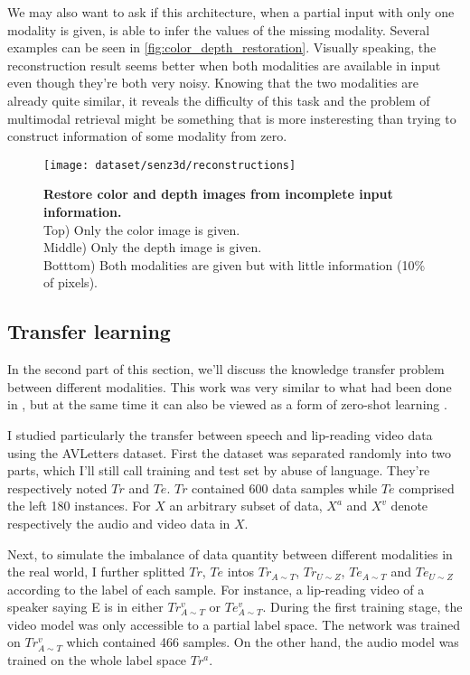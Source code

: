 We may also want to ask if this architecture, when a partial input with
only one modality is given, is able to infer the values of the missing
modality.
Several examples can be seen in \autoref{fig:color_depth_restoration}.
Visually speaking, the reconstruction result seems better when
both modalities are available in input even though they're both very noisy.
Knowing that the two modalities are already quite similar, it reveals
the difficulty of this task and the problem of multimodal retrieval
might be something that is more insteresting than trying to construct
information of some modality from zero.

\begin{figure}[H]
  \centering
  \texttt{[image: dataset/senz3d/reconstructions]}\\[-1em]
  \caption{%
    \textbf{Restore color and depth images from incomplete input
      information.}\\[0.1em]
    Top) Only the color image is given.\\[0.1em]
    Middle) Only the depth image is given.\\[0.1em]
    Botttom) Both modalities are given but with little information
      (10\% of pixels).}
  \label{fig:color_depth_restoration}
\end{figure}

\subsection{Transfer learning} \label{subsection:AVSR_transfer}

In the second part of this section, we'll discuss the knowledge transfer
problem between different modalities. This work was very similar to what
had been done in \cite{S. Moon 2015}, but at the same time it can also be
viewed as a form of zero-shot learning \cite{A. Frome 2013, R. Socher 2013}.

I studied particularly the transfer between speech and lip-reading
video data using the AVLetters dataset. First the dataset was separated
randomly into two parts, which I'll still call training and test set
by abuse of language. They're respectively noted $Tr$ and $Te$.
$Tr$ contained 600 data samples while $Te$ comprised the left 180 instances.
For $X$ an arbitrary subset of data, $X^a$ and $X^v$ denote respectively
the audio and video data in $X$.

Next, to simulate the imbalance of data quantity between different
modalities in the real world, I further splitted $Tr$, $Te$ intos
$Tr_{A\sim T}$, $Tr_{U\sim Z}$, $Te_{A\sim T}$ and $Te_{U\sim Z}$
according to the label of each sample.
For instance, a lip-reading video of a speaker saying E is in either
$Tr_{A\sim T}^v$ or $Te_{A\sim T}^v$.
During the first training stage, the video model was only accessible
to a partial label space. The network was trained on $Tr_{A\sim T}^v$
which contained 466 samples. On the other hand, the audio model was trained
on the whole label space $Tr^a$.

